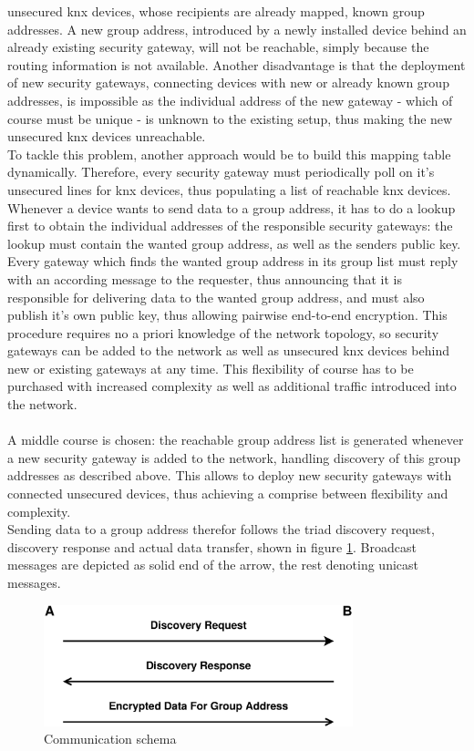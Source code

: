 unsecured \gls{knx} devices, whose recipients are already mapped, known group addresses. A new group address, introduced by a newly installed device behind
an already existing security gateway, will not be reachable, simply because the routing information is not available. 
Another disadvantage is that the deployment of new
security gateways, connecting devices with new or already known group addresses, is impossible as the individual address of the new gateway - which of
course must be unique - is unknown to the existing setup, thus making the new unsecured \gls{knx} devices unreachable.
\\
To tackle this problem, another approach would be to build this mapping table dynamically. Therefore, every security gateway must periodically poll
on it's unsecured lines for \gls{knx} devices, thus populating a list of reachable \gls{knx} devices. Whenever a 
device wants to send data to a group address, it has to do a lookup first to obtain the individual addresses of the responsible security gateways: the lookup
must contain the wanted group address, as well as the senders public key.
Every 
gateway which finds the wanted group address in its group list must reply with an according message to the requester, thus announcing that it is responsible
for delivering data to the wanted group address, and must also publish it's own public key, thus allowing pairwise end-to-end encryption.
This procedure requires no a priori knowledge of
the network topology, so security gateways can be added to the network as well as unsecured \gls{knx} devices behind new or existing gateways at any time. This
flexibility of course has to be purchased with increased complexity as well as additional traffic introduced into the network.
\\
\\
A middle course is chosen: the reachable group address list is generated whenever a new security gateway is added to the network,
 handling discovery of this group addresses as described
above. This allows to deploy new security gateways with connected unsecured devices, thus achieving a comprise between flexibility and complexity. 
\\
Sending data to a group address therefor follows the triad discovery request, discovery response and actual data transfer, shown in figure \ref{fig:prot1}. Broadcast
messages are depicted as solid end of the arrow, the rest denoting unicast messages.
\begin{figure}
  \centering
    \includegraphics[width=0.8\textwidth]{figures/protokoll1.eps}
 \caption{Communication schema}
 \label{fig:prot1}
\end{figure}
